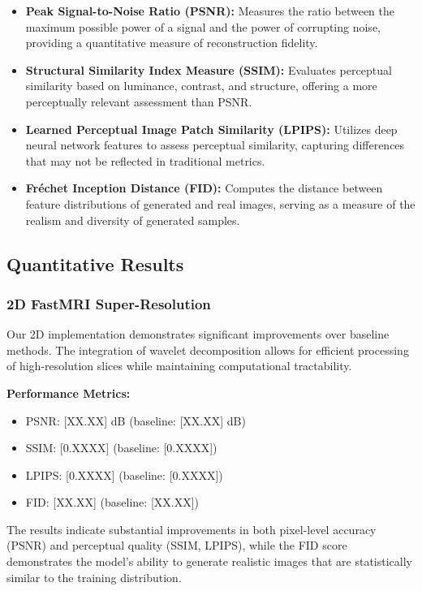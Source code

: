 \documentclass{midl} %
\begin{document}
\begin{itemize}
\item \textbf{Peak Signal-to-Noise Ratio (PSNR):} Measures the ratio between the maximum possible power of a signal and the power of corrupting noise, providing a quantitative measure of reconstruction fidelity.
\item \textbf{Structural Similarity Index Measure (SSIM):} Evaluates perceptual similarity based on luminance, contrast, and structure, offering a more perceptually relevant assessment than PSNR.
\item \textbf{Learned Perceptual Image Patch Similarity (LPIPS):} Utilizes deep neural network features to assess perceptual similarity, capturing differences that may not be reflected in traditional metrics.
\item \textbf{Fréchet Inception Distance (FID):} Computes the distance between feature distributions of generated and real images, serving as a measure of the realism and diversity of generated samples.
\end{itemize}

\subsection{Quantitative Results}

\subsubsection{2D FastMRI Super-Resolution}

Our 2D implementation demonstrates significant improvements over baseline methods. The integration of wavelet decomposition allows for efficient processing of high-resolution slices while maintaining computational tractability.

\textbf{Performance Metrics:}
\begin{itemize}
\item PSNR: [XX.XX] dB (baseline: [XX.XX] dB)
\item SSIM: [0.XXXX] (baseline: [0.XXXX])
\item LPIPS: [0.XXXX] (baseline: [0.XXXX])
\item FID: [XX.XX] (baseline: [XX.XX])
\end{itemize}

The results indicate substantial improvements in both pixel-level accuracy (PSNR) and perceptual quality (SSIM, LPIPS), while the FID score demonstrates the model's ability to generate realistic images that are statistically similar to the training distribution.
\end{document}

